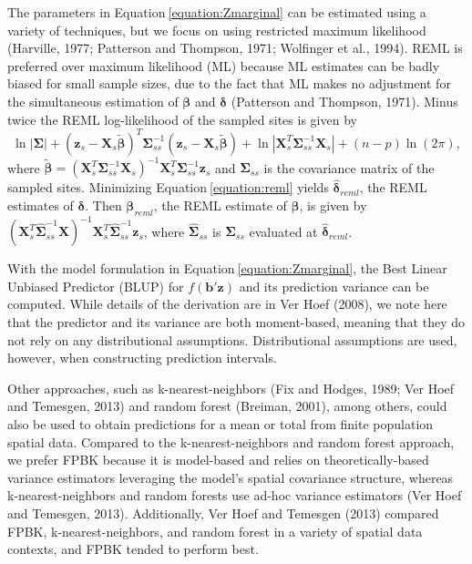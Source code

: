 \documentclass[]{elsarticle} %
\begin{document}
The parameters in Equation\(~\)\ref{equation:Zmarginal} can be estimated
using a variety of techniques, but we focus on using restricted maximum
likelihood (Harville, 1977; Patterson and Thompson, 1971; Wolfinger et
al., 1994). REML is preferred over maximum likelihood (ML) because ML
estimates can be badly biased for small sample sizes, due to the fact
that ML makes no adjustment for the simultaneous estimation of
\(\bm{\beta}\) and \(\bm{\delta}\) (Patterson and Thompson, 1971). Minus
twice the REML log-likelihood of the sampled sites is given by
\begin{equation}\label{equation:reml}
  \ln|\bm{\Sigma}| + (\bm{z}_s - \bm{X}_s \bm{\tilde{\beta}})^T \bm{\Sigma}_{ss}^{-1}(\bm{z}_s - \bm{X}_s \bm{\tilde{\beta}}) + \ln|\bm{X}_s^T \bm{\Sigma}_{ss}^{-1} \bm{X}_s| + (n - p) \ln(2 \pi) ,
\end{equation} where
\(\bm{\tilde{\beta}} = (\bm{X}_s^T \bm{\Sigma}_{ss}^{-1} \bm{X}_s)^{-1} \bm{X}_s^T \bm{\Sigma}_{ss}^{-1} \bm{z}_s\)
and \(\bm{\Sigma}_{ss}\) is the covariance matrix of the sampled sites.
Minimizing Equation\(~\)\ref{equation:reml} yields
\(\bm{\hat{\delta}}_{reml}\), the REML estimates of \(\bm{\delta}\).
Then \(\bm{\beta}_{reml}\), the REML estimate of \(\bm{\beta}\), is
given by
\((\bm{X}_s^T \bm{\hat{\Sigma}}_{ss}^{-1} \bm{X})^{-1} \bm{X}_s^T \bm{\hat{\Sigma}}_{ss}^{-1} \bm{z}_s\),
where \(\bm{\hat{\Sigma}}_{ss}\) is \(\bm{\Sigma}_{ss}\) evaluated at
\(\bm{\hat{\delta}}_{reml}\).

With the model formulation in Equation\(~\)\ref{equation:Zmarginal}, the
Best Linear Unbiased Predictor (BLUP) for \(f(\mathbf{b}'\mathbf{z})\)
and its prediction variance can be computed. While details of the
derivation are in Ver Hoef (2008), we note here that the predictor and
its variance are both moment-based, meaning that they do not rely on any
distributional assumptions. Distributional assumptions are used,
however, when constructing prediction intervals.

Other approaches, such as k-nearest-neighbors (Fix and Hodges, 1989; Ver
Hoef and Temesgen, 2013) and random forest (Breiman, 2001), among
others, could also be used to obtain predictions for a mean or total
from finite population spatial data. Compared to the k-nearest-neighbors
and random forest approach, we prefer FPBK because it is model-based and
relies on theoretically-based variance estimators leveraging the model's
spatial covariance structure, whereas k-nearest-neighbors and random
forests use ad-hoc variance estimators (Ver Hoef and Temesgen, 2013).
Additionally, Ver Hoef and Temesgen (2013) compared FPBK,
k-nearest-neighbors, and random forest in a variety of spatial data
contexts, and FPBK tended to perform best.
\end{document}
